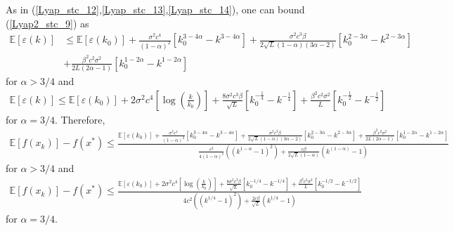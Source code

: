 \documentclass{article}
\theoremstyle{plain}
\theoremstyle{definition}
\theoremstyle{remark}
\begin{document}
    As in (\ref{Lyap_stc_12},\ref{Lyap_stc_13},\ref{Lyap_stc_14}), one can bound (\ref{Lyap2_stc_9}) as
    \begin{align}\label{Lyap2_stc_10}
        \mathbb E[\varepsilon(k)]&\leq \mathbb E[\varepsilon(k_0)]+\frac{\sigma^2 c^4}{(1-\alpha)^2} \left[ k_0^{3-4\alpha}-k^{3-4\alpha} \right] + \frac{\sigma^2c^3\beta}{2\sqrt{L}(1-\alpha)(3\alpha -2)}\left[ k_0^{2-3\alpha}-k^{2-3\alpha} \right]\nonumber\\
        &+\frac{\beta^2c^2\sigma^2}{2L(2\alpha-1)}\left[ k_0^{1-2\alpha}-k^{1-2\alpha} \right]
    \end{align}
    for $\alpha > 3/4$ and
    \begin{align}\label{Lyap2_stc_11}
        \mathbb E[\varepsilon(k)]\leq \mathbb E[\varepsilon(k_0)]+2\sigma^2 c^4 \left[ \log(\frac{k}{k_0}) \right] + \frac{8\sigma^2c^3\beta}{\sqrt{L}}\left[ k_0^{-\tfrac{1}{4}}-k^{-\tfrac{1}{4}} \right]
        +\frac{\beta^2c^2\sigma^2}{L}\left[ k_0^{-\tfrac{1}{2}}-k^{-\tfrac{1}{2}} \right]
    \end{align}
    for $\alpha=3/4$. Therefore,
    \begin{align}\label{Lyap2_stc_12}
        \mathbb E[f(x_k)]-f(x^*)\leq \tfrac{\mathbb E[\varepsilon(k_0)]+\frac{\sigma^2 c^4}{(1-\alpha)^2} \left[ k_0^{3-4\alpha}-k^{3-4\alpha} \right] + \frac{\sigma^2c^3\beta}{2\sqrt{L}(1-\alpha)(3\alpha -2)}\left[ k_0^{2-3\alpha}-k^{2-3\alpha} \right]+\frac{\beta^2c^2\sigma^2}{2L(2\alpha-1)}\left[ k_0^{1-2\alpha}-k^{1-2\alpha} \right]}{\frac{c^2}{4(1-\alpha)^2}\left((k^{1-\alpha}-1)^2\right)+\frac{c\beta}{2\sqrt{L}(1-\alpha)}\left(k^{(1-\alpha)}-1\right)}
    \end{align}
    for $\alpha > 3/4$ and
    \begin{align}\label{Lyap2_stc_13}
        \mathbb E[f(x_k)]-f(x^*)\leq \tfrac{\mathbb E[\varepsilon(k_0)]+2\sigma^2 c^4 \left[ \log(\frac{k}{k_0}) \right] + \frac{8\sigma^2c^3\beta}{\sqrt{L}}\left[ k_0^{-1/4}-k^{-1/4} \right]
        +\frac{\beta^2c^2\sigma^2}{L}\left[ k_0^{-1/2}-k^{-1/2} \right]}{4c^2\left((k^{1/4}-1)^2\right)+\frac{2c\beta}{\sqrt{L}}\left(k^{1/4}-1\right)}
    \end{align}
    for $\alpha=3/4$.
\end{document}
